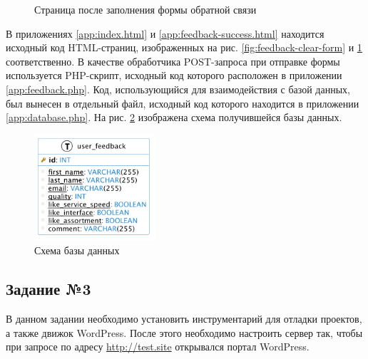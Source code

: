 \documentclass[a4paper, 14pt]{extarticle}
\begin{document}
\begin{figure}[H]
  \centering
  \caption{Страница после заполнения формы обратной связи}
  \label{fig:feedback-success}
\end{figure}

В приложениях \ref{app:index.html} и \ref{app:feedback-success.html} находится
исходный код HTML-страниц, изображенных на рис. \ref{fig:feedback-clear-form} и
\ref{fig:feedback-success} соответственно. В качестве обработчика POST-запроса
при отправке формы используется PHP-скрипт, исходный код которого расположен в
приложении \ref{app:feedback.php}. Код, использующийся для взаимодействия с
базой данных, был вынесен в отдельный файл, исходный код которого находится в
приложении \ref{app:database.php}. На рис. \ref{fig:database} изображена схема
получившейся базы данных.

\begin{figure}[H]
  \centering
  \includegraphics[width=0.4\textwidth]{images/puml/database.png}
  \caption{Схема базы данных}
  \label{fig:database}
\end{figure}

\subsection*{Задание №3}

В данном задании необходимо установить инструментарий для отладки проектов, а
также движок WordPress. После этого необходимо настроить сервер так, чтобы при
запросе по адресу \url{http://test.site} открывался портал WordPress.
\end{document}
